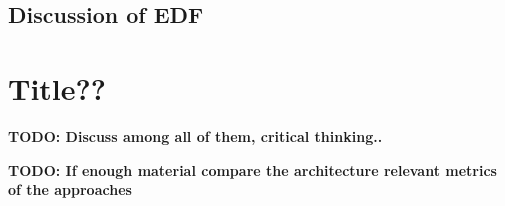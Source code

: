         \subsection{Discussion of EDF}
        \label{sub:discussion-edf}

    \section{Title??}
    \textbf{TODO: Discuss among all of them, critical thinking..}

    \textbf{TODO: If enough material compare the architecture relevant metrics of the approaches}